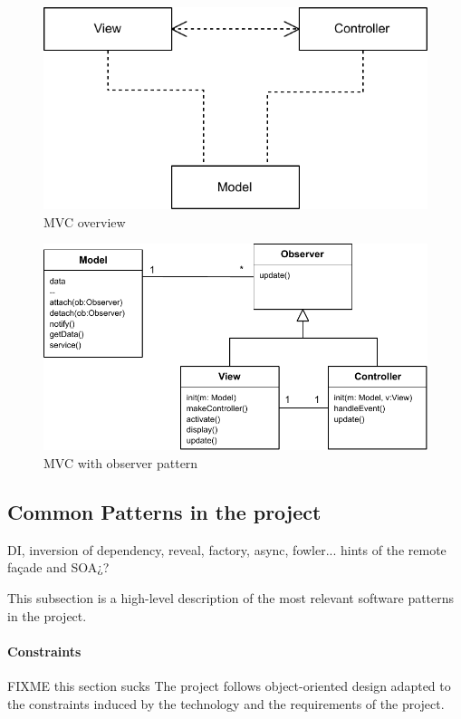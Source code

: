 \begin{figure}[htb]
    \centering
    \includegraphics{figures/design-patterns-mvc-1.pdf}
    \caption{MVC overview}
    \label{fig:mvc-overview}
\end{figure}

\begin{figure}[htb]
    \centering
    \includegraphics{figures/design-patterns-mvc-2.pdf}
    \caption{MVC with observer pattern}
    \label{fig:mvc-with-observer}
\end{figure}

\subsection{Common Patterns in the project}
DI, inversion of dependency, reveal, factory, async, fowler... hints of the remote façade and SOA¿?

This subsection is a high-level description of the most relevant software patterns in the project.

\paragraph{Constraints}
FIXME this section sucks 
The project follows object-oriented design adapted to the constraints induced by the technology and the requirements of the project.

